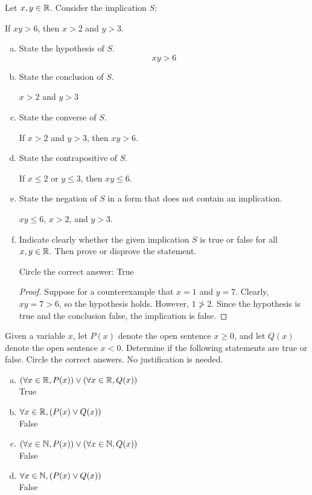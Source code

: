 \documentclass{agony}
\begin{document}
\question Let $x,y\in\mathbb{R}$. Consider the implication $S$:
\begin{center}
  If $xy > 6$, then $x > 2$ and $y > 3$.
\end{center}
\begin{enumerate}[(a)]
  \item State the hypothesis of $S$. \[ xy > 6 \]
  \item State the conclusion of $S$. \begin{center}
          $x>2$ and $y>3$
        \end{center}
  \item State the converse of $S$. \begin{center}
          If $x>2$ and $y>3$, then $xy>6$.
        \end{center}
  \item State the contrapositive of $S$. \begin{center}
          If $x \leq 2$ or $y \leq 3$, then $xy \leq 6$.
        \end{center}
  \item State the negation of $S$ in a form that does not contain an implication. \begin{center}
          $xy \leq 6$, $x > 2$, and $y > 3$.
        \end{center}
  \item Indicate clearly whether the given implication $S$ is true or false for all $x,y\in\mathbb{R}$.
        Then prove or disprove the statement.

        Circle the correct answer: \quad True \quad {}
        \begin{proof}
          Suppose for a counterexample that $x=1$ and $y=7$.
          Clearly, $xy=7>6$, so the hypothesis holds.
          However, $1 \not> 2$.
          Since the hypothesis is true and the conclusion false, the implication is false.
        \end{proof}
\end{enumerate}


\question Given a variable $x$, let $P(x)$ denote the open sentence $x \geq 0$,
and let $Q(x)$ denote the open sentence $x < 0$.
Determine if the following statements are true or false.
Circle the correct answers. No justification is needed.
\begin{enumerate}[(a)]
  \item $(\forall x\in\mathbb{R},P(x))\lor(\forall x\in\mathbb{R},Q(x))$ \\ True \quad {}
  \item $\forall x\in\mathbb{R},(P(x) \lor Q(x))$ \\  \quad False
  \item $(\forall x\in\mathbb{N},P(x))\lor(\forall x\in\mathbb{N},Q(x))$ \\  \quad False
  \item $\forall x\in\mathbb{N}, (P(x) \lor Q(x))$ \\  \quad False
\end{enumerate}
\end{document}
